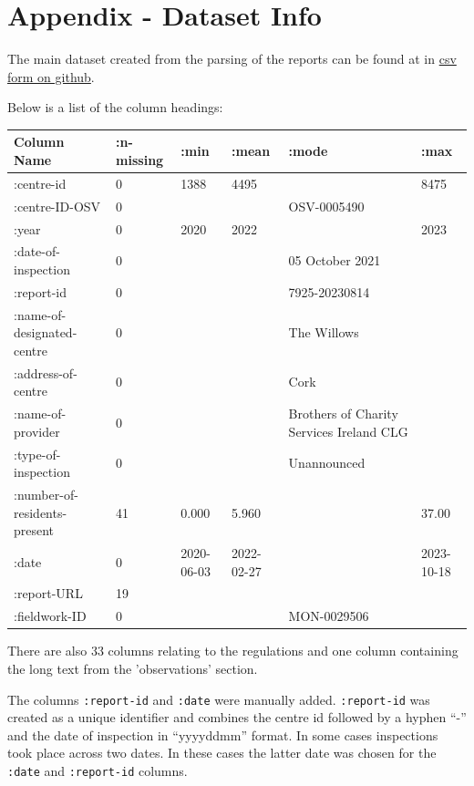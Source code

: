 \documentclass[a4paper,11pt,twoside]{article}
\begin{document}
\clearpage
\appendix
\section{Appendix - Dataset Info}
\label{sec:org9399f68}

The main dataset created from the parsing of the reports can be found at in \href{https://github.com/loopdreams/inspection-reports-hiqa/resources/datasets/created/pdf\_data\_full.csv}{csv form on github}.

Below is a list of the column headings:

\begin{center}
\begin{tabularx}{\textwidth}{XXXXXX}
\hline
Column Name & :n-missing & :min & :mean & :mode & :max\\[0pt]
\hline
\hline
:centre-id & 0 & 1388 & 4495 &  & 8475\\[0pt]
\hline
:centre-ID-OSV & 0 &  &  & OSV-0005490 & \\[0pt]
\hline
:year & 0 & 2020 & 2022 &  & 2023\\[0pt]
\hline
:date-of-inspection & 0 &  &  & 05 October 2021 & \\[0pt]
\hline
:report-id & 0 &  &  & 7925-20230814 & \\[0pt]
\hline
:name-of-designated-centre & 0 &  &  & The Willows & \\[0pt]
\hline
:address-of-centre & 0 &  &  & Cork & \\[0pt]
\hline
:name-of-provider & 0 &  &  & Brothers of Charity Services Ireland CLG & \\[0pt]
\hline
:type-of-inspection & 0 &  &  & Unannounced & \\[0pt]
\hline
:number-of-residents-present & 41 & 0.000 & 5.960 &  & 37.00\\[0pt]
\hline
:date & 0 & 2020-06-03 & 2022-02-27 &  & 2023-10-18\\[0pt]
\hline
:report-URL & 19 &  &  &  & \\[0pt]
\hline
:fieldwork-ID & 0 &  &  & MON-0029506 & \\[0pt]
\hline
\end{tabularx}
\end{center}


There are also 33 columns relating to the regulations and one column containing the long text from the 'observations' section.

The columns \texttt{:report-id} and \texttt{:date} were manually added. \texttt{:report-id} was created as a unique identifier and combines the centre id followed by a hyphen ``-'' and the date of inspection in ``yyyyddmm'' format. In some cases inspections took place across two dates. In these cases the latter date was chosen for the \texttt{:date} and \texttt{:report-id} columns.
\end{document}
